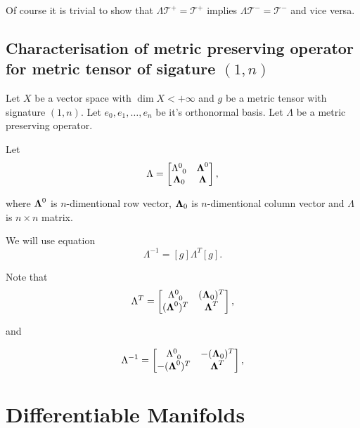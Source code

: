 \documentclass[main.tex]{subfiles}
\begin{document}
Of course it is trivial to show that $\Lambda \mathcal{T}^{+} = \mathcal{T}^{+}$ implies $\Lambda \mathcal{T}^{-} = \mathcal{T}^{-}$ and vice versa.

\subsection{Characterisation of metric preserving operator for metric tensor of sigature $(1,n)$}

Let $X$ be a vector space with $\dim X < +\infty$ and $g$ be a metric tensor with signature $(1, n)$. Let $e_0, e_1, \dots, e_n$ be it's orthonormal basis. Let $\Lambda$ be a metric preserving operator.

Let 
\begin{equation}
\Lambda = 
\begin{bmatrix}
    \tensor{\Lambda}{^0_0} &  \bs{\Lambda}^0 \\
    \bs{\Lambda}_0 & \bs{\Lambda} \\
\end{bmatrix},
\end{equation}

where $\boldsymbol{\Lambda}^0$ is $n$-dimentional row vector, $\boldsymbol{\Lambda}_0$ is $n$-dimentional column vector and $\Lambda$ is $n\times n$ matrix.

We will use equation
\begin{equation}
\Lambda^{-1} = [g]\Lambda^T[g].
\end{equation}

Note that
\begin{equation}
\Lambda^T = 
\begin{bmatrix}
    \tensor{\Lambda}{^0_0} &  (\bs{\Lambda}_0)^T \\
    (\bs{\Lambda}^0)^T & \bs{\Lambda}^T \\
\end{bmatrix},
\end{equation}

and

\begin{equation}
\Lambda^{-1} = 
\begin{bmatrix}
    \tensor{\Lambda}{^0_0} &  -(\bs{\Lambda}_0)^T \\
    -(\bs{\Lambda}^0)^T & \bs{\Lambda}^T \\
\end{bmatrix},
\end{equation}

\section{Differentiable Manifolds}
\end{document}
